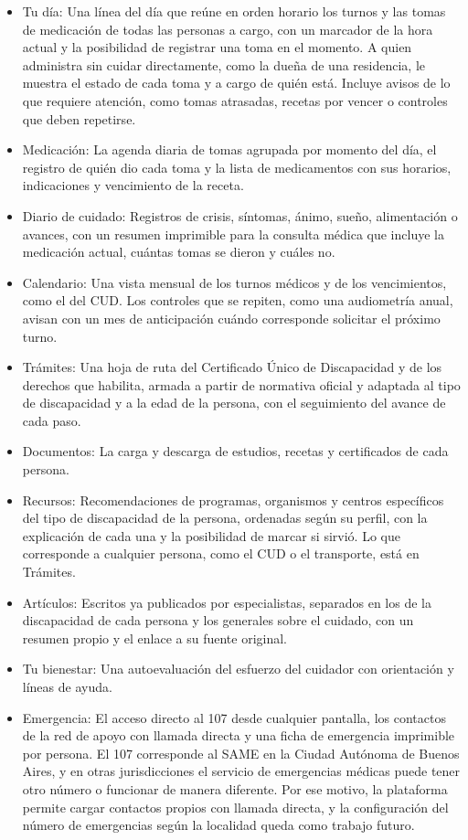 \begin{itemize}
    \item Tu día: Una línea del día que reúne en orden horario los turnos y las tomas de medicación de todas las personas a cargo, con un marcador de la hora actual y la posibilidad de registrar una toma en el momento. A quien administra sin cuidar directamente, como la dueña de una residencia, le muestra el estado de cada toma y a cargo de quién está. Incluye avisos de lo que requiere atención, como tomas atrasadas, recetas por vencer o controles que deben repetirse.
    \item Medicación: La agenda diaria de tomas agrupada por momento del día, el registro de quién dio cada toma y la lista de medicamentos con sus horarios, indicaciones y vencimiento de la receta.
    \item Diario de cuidado: Registros de crisis, síntomas, ánimo, sueño, alimentación o avances, con un resumen imprimible para la consulta médica que incluye la medicación actual, cuántas tomas se dieron y cuáles no.
    \item Calendario: Una vista mensual de los turnos médicos y de los vencimientos, como el del CUD. Los controles que se repiten, como una audiometría anual, avisan con un mes de anticipación cuándo corresponde solicitar el próximo turno.
    \item Trámites: Una hoja de ruta del Certificado Único de Discapacidad y de los derechos que habilita, armada a partir de normativa oficial y adaptada al tipo de discapacidad y a la edad de la persona, con el seguimiento del avance de cada paso.
    \item Documentos: La carga y descarga de estudios, recetas y certificados de cada persona.
    \item Recursos: Recomendaciones de programas, organismos y centros específicos del tipo de discapacidad de la persona, ordenadas según su perfil, con la explicación de cada una y la posibilidad de marcar si sirvió. Lo que corresponde a cualquier persona, como el CUD o el transporte, está en Trámites.
    \item Artículos: Escritos ya publicados por especialistas, separados en los de la discapacidad de cada persona y los generales sobre el cuidado, con un resumen propio y el enlace a su fuente original.
    \item Tu bienestar: Una autoevaluación del esfuerzo del cuidador con orientación y líneas de ayuda.
    \item Emergencia: El acceso directo al 107 desde cualquier pantalla, los contactos de la red de apoyo con llamada directa y una ficha de emergencia imprimible por persona. El 107 corresponde al SAME en la Ciudad Autónoma de Buenos Aires, y en otras jurisdicciones el servicio de emergencias médicas puede tener otro número o funcionar de manera diferente. Por ese motivo, la plataforma permite cargar contactos propios con llamada directa, y la configuración del número de emergencias según la localidad queda como trabajo futuro.

\end{itemize}
